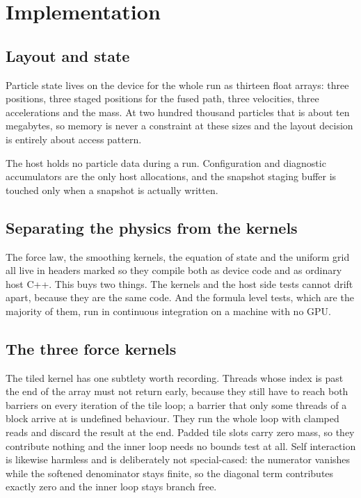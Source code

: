 \chapter{Implementation}
\label{ch:implementation}

\section{Layout and state}

Particle state lives on the device for the whole run as thirteen float arrays:
three positions, three staged positions for the fused path, three velocities,
three accelerations and the mass. At two hundred thousand particles that is
about ten megabytes, so memory is never a constraint at these sizes and the
layout decision is entirely about access pattern.

The host holds no particle data during a run. Configuration and diagnostic
accumulators are the only host allocations, and the snapshot staging buffer is
touched only when a snapshot is actually written.

\section{Separating the physics from the kernels}

The force law, the smoothing kernels, the equation of state and the uniform
grid all live in headers marked so they compile both as device code and as
ordinary host C++. This buys two things. The kernels and the host side tests
cannot drift apart, because they are the same code. And the formula level
tests, which are the majority of them, run in continuous integration on a
machine with no GPU.

\section{The three force kernels}

The tiled kernel has one subtlety worth recording. Threads whose index is past
the end of the array must not return early, because they still have to reach
both barriers on every iteration of the tile loop; a barrier that only some
threads of a block arrive at is undefined behaviour. They run the whole loop
with clamped reads and discard the result at the end. Padded tile slots carry
zero mass, so they contribute nothing and the inner loop needs no bounds test
at all. Self interaction is likewise harmless and is deliberately not
special-cased: the numerator vanishes while the softened denominator stays
finite, so the diagonal term contributes exactly zero and the inner loop stays
branch free.


